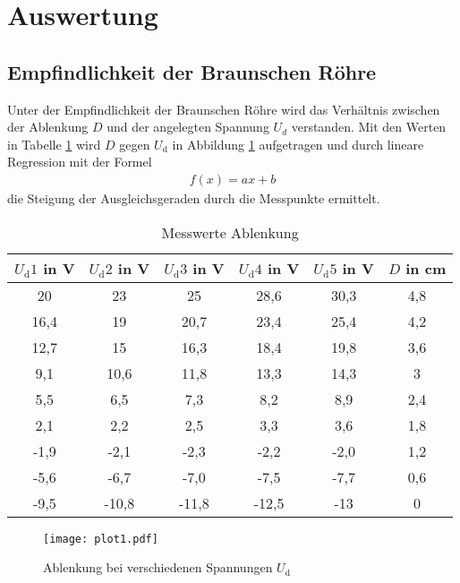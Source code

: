 \section{Auswertung}
\label{sec:Auswertung}

\subsection{Empfindlichkeit der Braunschen Röhre}
\label{sec:Empfindlichkeit}
Unter der Empfindlichkeit der Braunschen Röhre wird das Verhältnis zwischen der Ablenkung $D$ und der angelegten Spannung $U_d$ verstanden.
Mit den Werten in Tabelle \ref{tab:messwerte1} wird $D$ gegen $U_\text{d}$ in Abbildung \ref{fig:plot1} aufgetragen und durch lineare Regression mit der Formel
\begin{align*}
  f(x)=ax+b
\end{align*}
\noindent 
die Steigung der Ausgleichsgeraden durch die Messpunkte ermittelt.

\FloatBarrier
\begin{table}
  \centering
  \caption{Messwerte Ablenkung}
  \label{tab:messwerte1}
  \begin{tabular}{c c c c c c}
  \toprule
  $U_\text{d} 1$ in V & $U_\text{d} 2$ in V & $U_\text{d} 3$ in V & $U_\text{d} 4$ in V & $U_\text{d} 5$ in V & $D$ in cm \\
  \midrule
  20 & 23 & 25 & 28,6 & 30,3 & 4,8 \\
  16,4 & 19 & 20,7 & 23,4 & 25,4 & 4,2 \\
  12,7 & 15 & 16,3 & 18,4 & 19,8 & 3,6 \\
  9,1 & 10,6 & 11,8 & 13,3 & 14,3 & 3 \\
  5,5 & 6,5 & 7,3 & 8,2 & 8,9 & 2,4 \\
  2,1 & 2,2 & 2,5 & 3,3 & 3,6 & 1,8 \\
  -1,9 & -2,1 & -2,3 & -2,2 & -2,0 & 1,2 \\
  -5,6 & -6,7 & -7,0 & -7,5 & -7,7 & 0,6 \\
  -9,5 & -10,8 & -11,8 & -12,5 & -13 & 0 \\
  \bottomrule
\end{tabular}
\end{table}
\noindent 

\FloatBarrier
\begin{figure}
  \centering
  \texttt{[image: plot1.pdf]}
  \caption{Ablenkung bei verschiedenen Spannungen $U_\text{d}$}
  \label{fig:plot1}
\end{figure}

